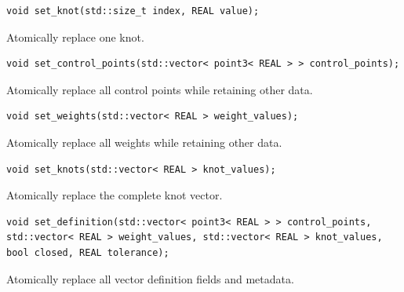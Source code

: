 \par\noindent\begin{minipage}{\linewidth}
\begin{lstlisting}[style=apireference]
void set_knot(std::size_t index, REAL value);
\end{lstlisting}
{\footnotesize Atomically replace one knot.\par}
\end{minipage}\par\vspace{1pt}
\par\noindent\begin{minipage}{\linewidth}
\begin{lstlisting}[style=apireference]
void set_control_points(std::vector< point3< REAL > > control_points);
\end{lstlisting}
{\footnotesize Atomically replace all control points while retaining other data.\par}
\end{minipage}\par\vspace{1pt}
\par\noindent\begin{minipage}{\linewidth}
\begin{lstlisting}[style=apireference]
void set_weights(std::vector< REAL > weight_values);
\end{lstlisting}
{\footnotesize Atomically replace all weights while retaining other data.\par}
\end{minipage}\par\vspace{1pt}
\par\noindent\begin{minipage}{\linewidth}
\begin{lstlisting}[style=apireference]
void set_knots(std::vector< REAL > knot_values);
\end{lstlisting}
{\footnotesize Atomically replace the complete knot vector.\par}
\end{minipage}\par\vspace{1pt}
\par\noindent\begin{minipage}{\linewidth}
\begin{lstlisting}[style=apireference]
void set_definition(std::vector< point3< REAL > > control_points, std::vector< REAL > weight_values, std::vector< REAL > knot_values, bool closed, REAL tolerance);
\end{lstlisting}
{\footnotesize Atomically replace all vector definition fields and metadata.\par}
\end{minipage}\par\vspace{1pt}
